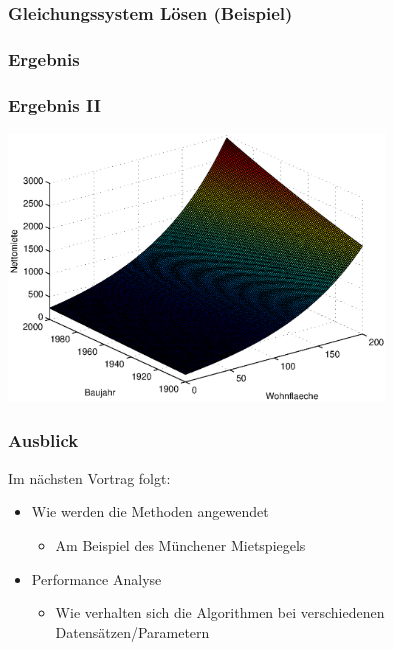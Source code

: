 \documentclass{beamer}
\begin{document}
\begin{frame}
  \frametitle{Gleichungssystem Lösen (Beispiel)}
  
\end{frame}

%  

\begin{frame}
  \frametitle{Ergebnis}
  
\end{frame}

\begin{frame}
  \frametitle{Ergebnis II}
  \begin{center}
    \includegraphics[width=10cm]{figures/nm_wfl_bj_log_approach}
  \end{center}

\end{frame}

\begin{frame}
  \frametitle{Ausblick}
  
  Im nächsten Vortrag folgt:
  \begin{itemize}
  \item Wie werden die Methoden angewendet
    \begin{itemize}
    \item Am Beispiel des Münchener Mietspiegels
    \end{itemize}
  \item Performance Analyse
    \begin{itemize}
    \item Wie verhalten sich die Algorithmen bei verschiedenen Datensätzen/Parametern 
    \end{itemize}
  \end{itemize}

\end{frame}
\end{document}
